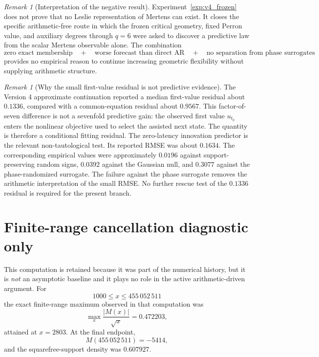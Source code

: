 \documentclass[11pt]{amsart}
\numberwithin{equation}{section}
\theoremstyle{plain}
\theoremstyle{definition}
\theoremstyle{remark}
\newtheorem{remark}[theorem]{Remark}
\begin{document}
\begin{remark}[Interpretation of the negative result]
\label{rem:v4_negative_interpretation}
Experiment~\ref{exp:v4_frozen} does not prove that no Leslie representation of Mertens can
exist.  It closes the specific arithmetic-free route in which the frozen critical geometry,
fixed Perron value, and auxiliary degrees through $q=6$ were asked to discover a predictive law
from the scalar Mertens observable alone.  The combination
\[
\text{zero exact membership}
\quad+\quad
\text{worse forecast than direct AR}
\quad+\quad
\text{no separation from phase surrogates}
\]
provides no empirical reason to continue increasing geometric flexibility without supplying
arithmetic structure.
\end{remark}

\begin{remark}[Why the small first-value residual is not predictive evidence]
\label{rem:first_value_residual_contamination}
The Version 4 approximate continuation reported a median first-value residual about $0.1336$,
compared with a common-equation residual about $0.9567$.  This factor-of-seven difference is not
a sevenfold predictive gain: the observed first value $u_{t_0}$ enters the nonlinear objective
used to select the assisted next state.  The quantity is therefore a conditional fitting
residual.  The zero-latency innovation predictor is the relevant non-tautological test.  Its
reported RMSE was about $0.1634$.  The corresponding empirical values were approximately
$0.0196$ against support-preserving random signs, $0.0392$ against the Gaussian null, and
$0.3077$ against the phase-randomized surrogate.  The failure against the phase surrogate removes
the arithmetic interpretation of the small RMSE.  No further rescue test of the $0.1336$ residual
is required for the present branch.
\end{remark}


\section{Finite-range cancellation diagnostic only}
\label{sec:finite_range_envelope}

This computation is retained because it was part of the numerical history, but it is
\emph{not} an asymptotic baseline and it plays no role in the active arithmetic-driven argument.
For
\[
1000\le x\le455\,052\,511
\]
the exact finite-range maximum observed in that computation was
\begin{equation}
\max_x\frac{|M(x)|}{\sqrt x}
=
0.472203,
\label{eq:finite_C_mu}
\end{equation}
attained at $x=2803$.  At the final endpoint,
\[
M(455\,052\,511)=-5414,
\]
and the squarefree-support density was $0.607927$.
\end{document}
